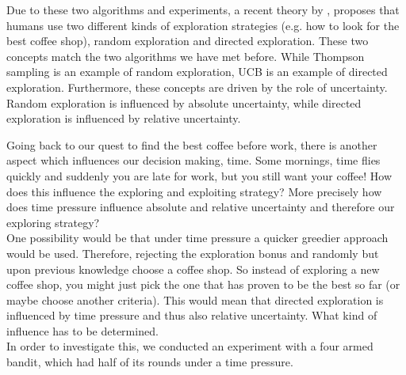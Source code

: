 Due to these two algorithms and experiments, a recent theory by \cite{gershman2018deconstructing}, proposes that humans use two different kinds of exploration strategies (e.g.  how to look for the best coffee shop), random exploration and directed exploration. These two concepts match the two algorithms we have met before. While Thompson sampling is an example of random exploration, UCB is an example of directed exploration. Furthermore, these concepts are driven by the role of uncertainty. Random exploration is influenced by absolute uncertainty, while directed exploration is influenced by relative uncertainty. 

Going back to our quest to find the best coffee before work, there is another aspect which influences our decision making, time. Some mornings, time flies quickly and suddenly you are late for work, but you still want your coffee! How does this influence the exploring and exploiting strategy? More precisely how does time pressure influence absolute and relative uncertainty and therefore our exploring strategy? \\
One possibility would be that under time pressure a quicker greedier approach would be used. Therefore, rejecting the exploration bonus and randomly but upon previous knowledge choose a coffee shop. So instead of exploring a new coffee shop, you might just pick the one that has proven to be the best so far (or maybe choose another criteria). This would mean that directed exploration is influenced by time pressure and thus also relative uncertainty. What kind of influence has to be determined.\\
In order to investigate this, we conducted an experiment with a four armed bandit, which had half of its rounds under a time pressure. 


\newpage

